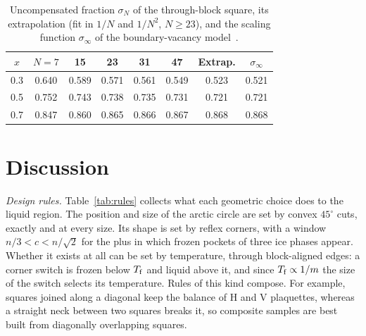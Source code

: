 \documentclass[reprint,aps,prb,floatfix,longbibliography,amsmath,amssymb]{revtex4-2}
\begin{document}
\begin{table}[t]
\caption{\label{tab:vacancy}Uncompensated fraction $\sigma_N$ of the through-block square, its extrapolation (fit in $1/N$ and $1/N^2$, $N\ge23$), and the scaling function $\sigma_\infty$ of the boundary-vacancy model~\cite{WonVacancies}.}
\begin{ruledtabular}
\begin{tabular}{cccccccc}
$x$ & $N=7$ & 15 & 23 & 31 & 47 & Extrap. & $\sigma_\infty$ \\
\hline
0.3 & 0.640 & 0.589 & 0.571 & 0.561 & 0.549 & 0.523 & 0.521 \\
0.5 & 0.752 & 0.743 & 0.738 & 0.735 & 0.731 & 0.721 & 0.721 \\
0.7 & 0.847 & 0.860 & 0.865 & 0.866 & 0.867 & 0.868 & 0.868 \\
\end{tabular}
\end{ruledtabular}
\end{table}

\section{Discussion}\label{sec:discussion}

\emph{Design rules.} Table~\ref{tab:rules} collects what each geometric choice does to the liquid region. The position and size of the arctic circle are set by convex $45^\circ$ cuts, exactly and at every size. Its shape is set by reflex corners, with a window $n/3<c<n/\sqrt2$ for the plus in which frozen pockets of three ice phases appear. Whether it exists at all can be set by temperature, through block-aligned edges: a corner switch is frozen below $T_{\rm f}$ and liquid above it, and since $T_{\rm f}\propto1/m$ the size of the switch selects its temperature. Rules of this kind compose. For example, squares joined along a diagonal keep the balance of H and V plaquettes, whereas a straight neck between two squares breaks it, so composite samples are best built from diagonally overlapping squares.
\end{document}
